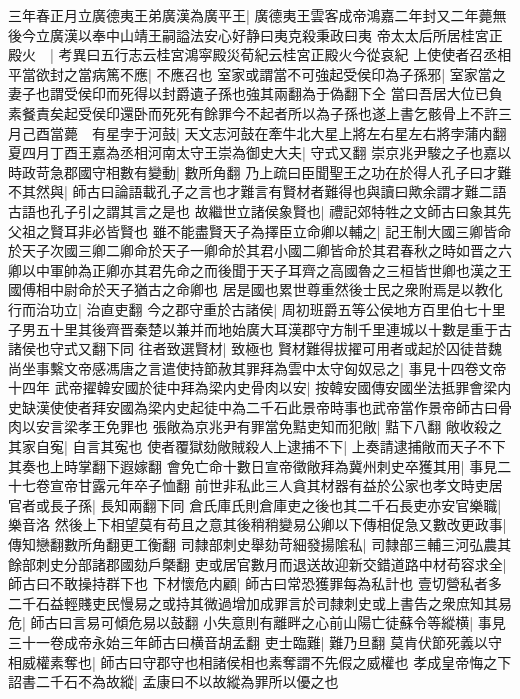 三年春正月立廣德夷王弟廣漢為廣平王|{
	廣德夷王雲客成帝鴻嘉二年封又二年薨無後今立廣漢以奉中山靖王嗣謚法安心好静曰夷克殺秉政曰夷}
帝太太后所居桂宮正殿火　|{
	考異曰五行志云桂宮鴻寜殿災荀紀云桂宮正殿火今從哀紀}
上使使者召丞相平當欲封之當病篤不應|{
	不應召也}
室家或謂當不可強起受侯印為子孫邪|{
	室家當之妻子也謂受侯印而死得以封爵遺子孫也強其兩翻為于偽翻下仝}
當曰吾居大位已負素餐責矣起受侯印還卧而死死有餘罪今不起者所以為子孫也遂上書乞骸骨上不許三月己酉當薨　有星孛于河鼓|{
	天文志河鼓在牽牛北大星上將左右星左右將孛蒲内翻}
夏四月丁酉王嘉為丞相河南太守王崇為御史大夫|{
	守式又翻}
崇京兆尹駿之子也嘉以時政苛急郡國守相數有變動|{
	數所角翻}
乃上疏曰臣聞聖王之功在於得人孔子曰才難不其然與|{
	師古曰論語載孔子之言也才難言有賢材者難得也與讀曰歟余謂才難二語古語也孔子引之謂其言之是也}
故繼世立諸侯象賢也|{
	禮記郊特牲之文師古曰象其先父祖之賢耳非必皆賢也}
雖不能盡賢天子為擇臣立命卿以輔之|{
	記王制大國三卿皆命於天子次國三卿二卿命於天子一卿命於其君小國二卿皆命於其君春秋之時如晋之六卿以中軍帥為正卿亦其君先命之而後聞于天子耳齊之高國魯之三桓皆世卿也漢之王國傅相中尉命於天子猶古之命卿也}
居是國也累世尊重然後士民之衆附焉是以教化行而治功立|{
	治直吏翻}
今之郡守重於古諸侯|{
	周初班爵五等公侯地方百里伯七十里子男五十里其後齊晋秦楚以兼并而地始廣大耳漢郡守方制千里連城以十數是重于古諸侯也守式又翻下同}
往者致選賢材|{
	致極也}
賢材難得拔擢可用者或起於囚徒昔魏尚坐事繫文帝感馮唐之言遣使持節赦其罪拜為雲中太守匈奴忌之|{
	事見十四卷文帝十四年}
武帝擢韓安國於徒中拜為梁内史骨肉以安|{
	按韓安國傳安國坐法抵罪會梁内史缺漢使使者拜安國為梁内史起徒中為二千石此景帝時事也武帝當作景帝師古曰骨肉以安言梁孝王免罪也}
張敞為京兆尹有罪當免黠吏知而犯敞|{
	黠下八翻}
敞收殺之其家自寃|{
	自言其寃也}
使者覆獄劾敞賊殺人上逮捕不下|{
	上奏請逮捕敞而天子不下其奏也上時掌翻下遐嫁翻}
會免亡命十數日宣帝徵敞拜為冀州刺史卒獲其用|{
	事見二十七卷宣帝甘露元年卒子恤翻}
前世非私此三人貪其材器有益於公家也孝文時吏居官者或長子孫|{
	長知兩翻下同}
倉氏庫氏則倉庫吏之後也其二千石長吏亦安官樂職|{
	樂音洛}
然後上下相望莫有苟且之意其後稍稍變易公卿以下傳相促急又數改更政事|{
	傳知戀翻數所角翻更工衡翻}
司隸部刺史舉劾苛細發揚隂私|{
	司隸部三輔三河弘農其餘部刺史分部諸郡國劾戶槩翻}
吏或居官數月而退送故迎新交錯道路中材苟容求全|{
	師古曰不敢操持群下也}
下材懷危内顧|{
	師古曰常恐獲罪每為私計也}
壹切營私者多二千石益輕賤吏民慢易之或持其微過增加成罪言於司隸刺史或上書告之衆庶知其易危|{
	師古曰言易可傾危易以鼓翻}
小失意則有離畔之心前山陽亡徒蘇令等縱横|{
	事見三十一卷成帝永始三年師古曰横音胡孟翻}
吏士臨難|{
	難乃旦翻}
莫肯伏節死義以守相威權素奪也|{
	師古曰守郡守也相諸侯相也素奪謂不先假之威權也}
孝成皇帝悔之下詔書二千石不為故縱|{
	孟康曰不以故縱為罪所以優之也}

